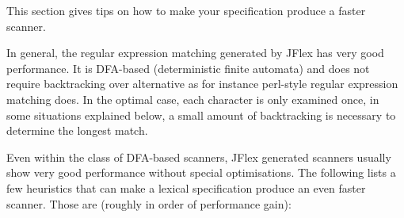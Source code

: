 This section gives tips on how to make your specification produce a
faster scanner.

In general, the regular expression matching generated by JFlex has very
good performance. It is DFA-based (deterministic finite automata) and
does not require backtracking over alternative as for instance
perl-style regular expression matching does. In the optimal case, each
character is only examined once, in some situations explained below, a
small amount of backtracking is necessary to determine the longest
match.

Even within the class of DFA-based scanners, JFlex generated scanners
usually show very good performance without special optimisations. The
following lists a few heuristics that can make a lexical specification
produce an even faster scanner. Those are (roughly in order of
performance gain):


